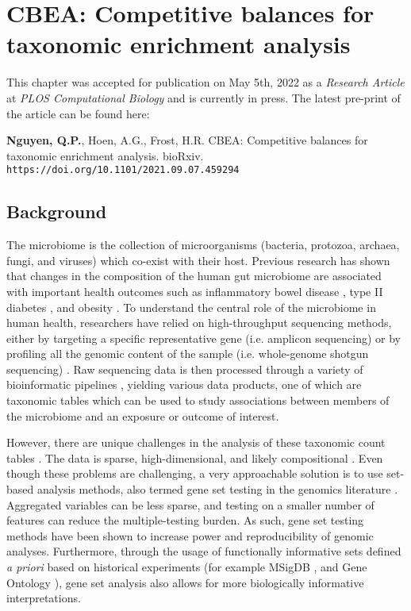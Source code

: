\chapter{CBEA: Competitive balances for taxonomic enrichment analysis}
This chapter was accepted for publication on May 5th, 2022 as a \emph{Research Article} at \emph{PLOS Computational Biology} and is currently in press. The latest pre-print of the article can be found here: 

\begin{center}
\justifying
\textbf{Nguyen, Q.P.}, Hoen, A.G., Frost, H.R. CBEA: Competitive balances for taxonomic enrichment analysis. bioRxiv. \texttt{https://doi.org/10.1101/2021.09.07.459294}
\end{center}

\section{Background} \label{introduction}
The microbiome is the collection of microorganisms (bacteria, protozoa, archaea, fungi, and viruses) which co-exist with their host. Previous research has shown that changes in the composition of the human gut microbiome are associated with important health outcomes such as inflammatory bowel disease \cite{proctor2019}, type II diabetes \cite{sharma2019a}, and obesity \cite{aoun2020}. To understand the central role of the microbiome in human health, researchers have relied on high-throughput sequencing methods, either by targeting a specific representative gene (i.e. amplicon sequencing) or by profiling all the genomic content of the sample (i.e. whole-genome shotgun sequencing) \cite{cho2012}. Raw sequencing data is then processed through a variety of bioinformatic pipelines \cite{callahan2016, truong2015}, yielding various data products, one of which are taxonomic tables which can be used to study associations between members of the microbiome and an exposure or outcome of interest. 

However, there are unique challenges in the analysis of these taxonomic count tables \cite{li2019a,li2015}. The data is sparse, high-dimensional, and likely compositional \cite{gloor2017, li2019a, li2015}. Even though these problems are challenging, a very approachable solution is to use set-based analysis methods, also termed gene set testing in the genomics literature \cite{khatri2012, goeman2007}. Aggregated variables can be less sparse, and testing on a smaller number of features can reduce the multiple-testing burden. As such, gene set testing methods have been shown to increase power and reproducibility of genomic analyses. Furthermore, through the usage of functionally informative sets defined \emph{a priori} based on historical experiments (for example MSigDB \cite{subramanian2005}, and Gene Ontology \cite{ashburner2000}), gene set analysis also allows for more biologically informative interpretations. 

